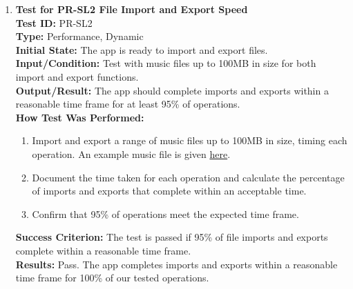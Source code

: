 \documentclass[12pt, titlepage]{article}
\begin{document}
\begin{enumerate}
    \item \textbf{Test for PR-SL2 File Import and Export Speed} \\
      \newline
      \textbf{Test ID:} PR-SL2 \\
      \textbf{Type:} Performance, Dynamic \\
      \textbf{Initial State:} The app is ready to import and export files. \\
      \textbf{Input/Condition:} Test with music files up to 100MB in size for both import and export functions. \\
      \textbf{Output/Result:} The app should complete imports and exports within a reasonable time frame for at least 95\% of operations. \\
      \textbf{How Test Was Performed:}
      \begin{enumerate}
          \item Import and export a range of music files up to 100MB in size, timing each operation. An example music file is given 
          \href{https://github.com/emilyperica/ScoreGen/blob/main/test/TestingDatasets/piano-samples/sample-songs/hot-cross-buns-piano-solo.wav}{here}.
          \item Document the time taken for each operation and calculate the percentage of imports and exports that complete within an acceptable time.
          \item Confirm that 95\% of operations meet the expected time frame.
      \end{enumerate}
      \textbf{Success Criterion:} The test is passed if 95\% of file imports and exports complete within a reasonable time frame.\\
      \textbf{Results:} Pass. The app completes imports and exports within a reasonable time frame for 100\% of our tested operations.\\


\end{enumerate}
\end{document}
